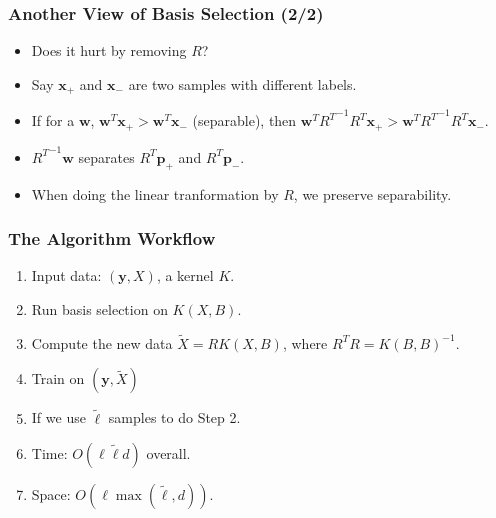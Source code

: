 \documentclass{beamer}
\def\bw{{\boldsymbol w}}
\def\bp{{\boldsymbol p}}
\def\bx{{\boldsymbol x}}
\def\by{{\boldsymbol y}}
\begin{document}
\begin{frame}
  \frametitle{Another View of Basis Selection (2/2)}
  \begin{itemize}
    \item Does it hurt by removing $R$?
    \pause
    \item Say $\bx_+$ and $\bx_-$ are two samples with different labels.
    \pause
    \item If for a $\bw$, $\bw^T\bx_+ > \bw^T\bx_-$ (separable), then
    $\bw^T{R^T}^{-1}R^T\bx_+  > \bw^T{R^T}^{-1}R^T\bx_-$.
    \pause
    \item ${R^T}^{-1}\bw$ separates $R^T\bp_+$ and $R^T\bp_-$.
    \pause
    \item When doing the linear tranformation by $R$, we preserve separability.
  \end{itemize}
\end{frame}

\begin{frame}
  \frametitle{The Algorithm Workflow}
  \begin{enumerate}
    \item Input data: $(\by, X)$, a kernel $K$.
    \item Run basis selection on $K(X, B)$.
    \item Compute the new data $\tilde{X} = RK(X, B)$, where $ R^TR =  K(B, B)^{-1}$.
    \item Train on $(\by, \tilde{X})$
    \pause
    \item [] If we use $\tilde{\ell}$ samples to do Step 2.
    \pause
    \item [] Time: $O(\ell \tilde{\ell} d)$ overall.
    \item [] Space: $O(\ell \max(\tilde{\ell}, d))$.
  \end{enumerate}
\end{frame}

\end{document}
